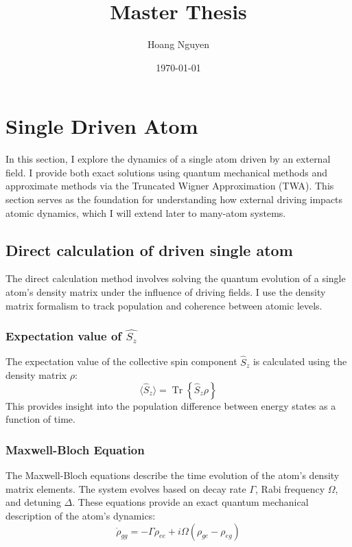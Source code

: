 \documentclass{article}
\title{Master Thesis}
\author{Hoang Nguyen}
\date{\today}
\begin{document}
\maketitle

    \section{Single Driven Atom}
    In this section, I explore the dynamics of a single atom driven by an external field. I provide both exact solutions using quantum mechanical methods and approximate methods via the Truncated Wigner Approximation (TWA). This section serves as the foundation for understanding how external driving impacts atomic dynamics, which I will extend later to many-atom systems.

    \subsection{Direct calculation of driven single atom}
    The direct calculation method involves solving the quantum evolution of a single atom's density matrix under the influence of driving fields. I use the density matrix formalism to track population and coherence between atomic levels.
    
    \subsubsection{Expectation value of $\hat{S_z}$}
    The expectation value of the collective spin component $\hat{S}_z$ is calculated using the density matrix $\rho$:
    \begin{equation}
        \langle \hat{S}_z \rangle = \operatorname{Tr}\left\{\hat{S}_z \rho\right\}
    \end{equation}
    This provides insight into the population difference between energy states as a function of time.

    \subsubsection{Maxwell-Bloch Equation}
    The Maxwell-Bloch equations describe the time evolution of the atom's density matrix elements. The system evolves based on decay rate $\Gamma$, Rabi frequency $\Omega$, and detuning $\Delta$. These equations provide an exact quantum mechanical description of the atom's dynamics:
    \begin{equation}
        \dot{\rho}_{gg} = -\Gamma \rho_{ee} + i \Omega (\rho_{ge} - \rho_{eg})
    \end{equation}
    
\end{document}
